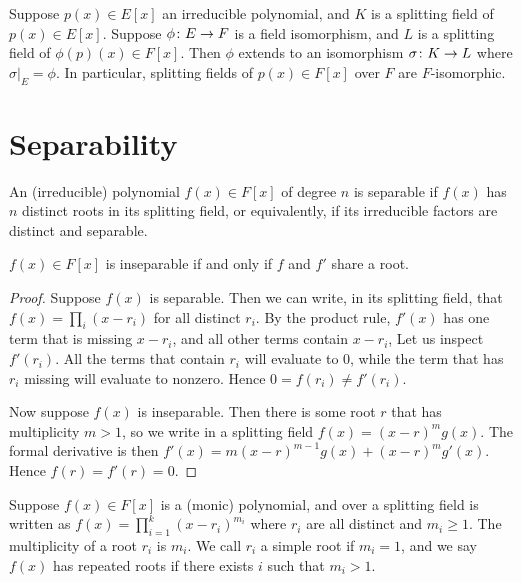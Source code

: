 \begin{theorem}\label{thm:uniqueness-splitting-field}
    Suppose \(p(x) \in E[x]\) an irreducible polynomial,
    and \(K\) is a splitting field of \(p(x) \in E[x]\).
    Suppose \(\phi\colon E\to F\) is a field isomorphism,
    and \(L\) is a splitting field of \(\phi(p)(x) \in F[x]\).
    Then \(\phi\) extends to an isomorphism \(\sigma\colon K\to L\)
    where \(\sigma\vert_E = \phi\).
    In particular, splitting fields of \(p(x) \in F[x]\) over \(F\)
    are \(F\)-isomorphic.
\end{theorem}


\section{Separability}

\begin{definition}
    An (irreducible) polynomial \(f(x) \in F[x]\) of degree \(n\)
    is separable if \(f(x)\) has \(n\) distinct roots in its splitting field,
    or equivalently, if its irreducible factors are distinct and separable.
\end{definition}
\begin{proposition}\label{prop:derivative-inseparability}
    \(f(x) \in F[x]\) is inseparable
    if and only if \(f\) and \(f'\) share a root.
\end{proposition}
\begin{proof}
    Suppose \(f(x)\) is separable.
    Then we can write, in its splitting field,
    that \(f(x) = \prod_i (x-r_i)\) for all distinct \(r_i\).
    By the product rule,
    \(f'(x)\) has one term that is missing \(x-r_i\),
    and all other terms contain \(x-r_i\),
    Let us inspect \(f'(r_i)\).
    All the terms that contain \(r_i\) will evaluate to 0,
    while the term that has \(r_i\) missing will evaluate to nonzero.
    Hence \(0 = f(r_i) \neq f'(r_i)\).

    Now suppose \(f(x)\) is inseparable.
    Then there is some root \(r\) that has multiplicity \(m > 1\),
    so we write in a splitting field \(f(x) = {(x-r)}^m g(x)\).
    The formal derivative is then \(f'(x) = m{(x-r)}^{m-1} g(x) + {(x-r)}^m g'(x)\).
    Hence \(f(r) = f'(r) = 0\).
\end{proof}

\begin{definition}
    Suppose \(f(x) \in F[x]\) is a (monic) polynomial,
    and over a splitting field is written as
    \(f(x) = \prod_{i=1}^k {(x-r_i)}^{m_i}\)
    where \(r_i\) are all distinct and \(m_i \geq 1\).
    The multiplicity of a root \(r_i\) is \(m_i\).
    We call \(r_i\) a simple root if \(m_i = 1\),
    and we say \(f(x)\) has repeated roots if there exists \(i\)
    such that \(m_i > 1\).
\end{definition}

